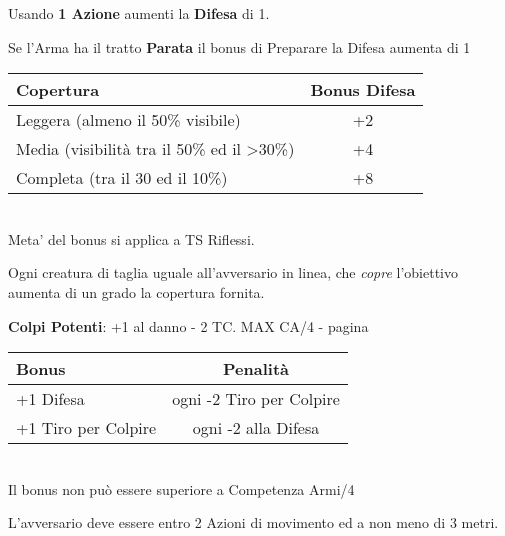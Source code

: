 \documentclass[landscape,10pt,a4paper]{article}
\begin{document}
\begin{multicols}{3}
\begin{dmbox}[title=Preparare la Difesa - pagina \pageref{preparareladifesa}]

Usando \textbf{1 Azione} aumenti la \textbf{Difesa} di 1.

Se l'Arma ha il tratto \textbf{Parata} il bonus di Preparare la Difesa aumenta di 1
\end{dmbox}

\begin{dmbox}[title=Copertura - pagina \pageref{copertura}]
\noindent\begin{tabular}{l|c}
\textbf{Copertura} & \textbf{Bonus Difesa}\\
\hline
Leggera (almeno il 50\% visibile) & +2\\
Media (visibilità tra il 50\% ed il >30\%) & +4 \\
Completa (tra il 30 ed il 10\%) & +8 \\
\end{tabular}\\

Meta' del bonus si applica a TS Riflessi.

Ogni creatura di taglia uguale all'avversario in linea, che \emph{copre} l'obiettivo aumenta di un grado la copertura fornita.

\end{dmbox}

\begin{mybluebox}\textbf{Colpi Potenti}: +1 al danno - 2 TC. MAX CA/4 - pagina \pageref{colpipotenti}\end{mybluebox}


\begin{dmbox}[title=Maestria del combattimento - pagina \pageref{maestriacombattimento}]
\noindent\begin{tabular}{l|c}
\textbf{Bonus} & \textbf{Penalità}\\
\hline
+1 Difesa & ogni -2 Tiro per Colpire\\
+1 Tiro per Colpire & ogni -2 alla Difesa
\end{tabular}\\

Il bonus non può essere superiore a Competenza Armi/4
\end{dmbox}

\begin{dmbox}[title=Carica - pagina \pageref{carica}]

L'avversario deve essere entro 2 Azioni di movimento ed a non meno di 3 metri. 


\end{dmbox}
\end{multicols}
\end{document}
